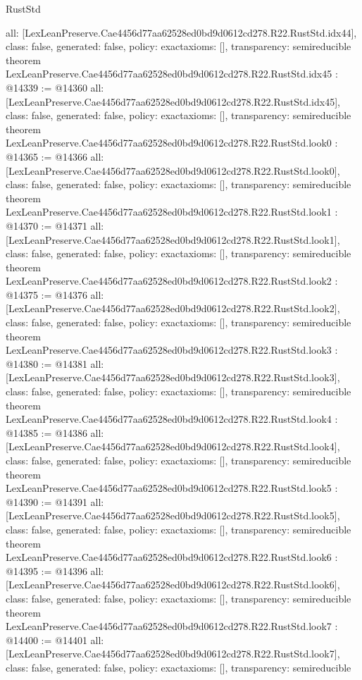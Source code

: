 \begin{lexlean}{RustStd}
\begin{coremodule}
{  all: [LexLeanPreserve.Cae4456d77aa62528ed0bd9d0612cd278.R22.RustStd.idx44],
  class: false,
  generated: false,
  policy: exact{axioms: []},
  transparency: semireducible
}
theorem LexLeanPreserve.Cae4456d77aa62528ed0bd9d0612cd278.R22.RustStd.idx45 : @14339 := @14360 {
  all: [LexLeanPreserve.Cae4456d77aa62528ed0bd9d0612cd278.R22.RustStd.idx45],
  class: false,
  generated: false,
  policy: exact{axioms: []},
  transparency: semireducible
}
theorem LexLeanPreserve.Cae4456d77aa62528ed0bd9d0612cd278.R22.RustStd.look0 : @14365 := @14366 {
  all: [LexLeanPreserve.Cae4456d77aa62528ed0bd9d0612cd278.R22.RustStd.look0],
  class: false,
  generated: false,
  policy: exact{axioms: []},
  transparency: semireducible
}
theorem LexLeanPreserve.Cae4456d77aa62528ed0bd9d0612cd278.R22.RustStd.look1 : @14370 := @14371 {
  all: [LexLeanPreserve.Cae4456d77aa62528ed0bd9d0612cd278.R22.RustStd.look1],
  class: false,
  generated: false,
  policy: exact{axioms: []},
  transparency: semireducible
}
theorem LexLeanPreserve.Cae4456d77aa62528ed0bd9d0612cd278.R22.RustStd.look2 : @14375 := @14376 {
  all: [LexLeanPreserve.Cae4456d77aa62528ed0bd9d0612cd278.R22.RustStd.look2],
  class: false,
  generated: false,
  policy: exact{axioms: []},
  transparency: semireducible
}
theorem LexLeanPreserve.Cae4456d77aa62528ed0bd9d0612cd278.R22.RustStd.look3 : @14380 := @14381 {
  all: [LexLeanPreserve.Cae4456d77aa62528ed0bd9d0612cd278.R22.RustStd.look3],
  class: false,
  generated: false,
  policy: exact{axioms: []},
  transparency: semireducible
}
theorem LexLeanPreserve.Cae4456d77aa62528ed0bd9d0612cd278.R22.RustStd.look4 : @14385 := @14386 {
  all: [LexLeanPreserve.Cae4456d77aa62528ed0bd9d0612cd278.R22.RustStd.look4],
  class: false,
  generated: false,
  policy: exact{axioms: []},
  transparency: semireducible
}
theorem LexLeanPreserve.Cae4456d77aa62528ed0bd9d0612cd278.R22.RustStd.look5 : @14390 := @14391 {
  all: [LexLeanPreserve.Cae4456d77aa62528ed0bd9d0612cd278.R22.RustStd.look5],
  class: false,
  generated: false,
  policy: exact{axioms: []},
  transparency: semireducible
}
theorem LexLeanPreserve.Cae4456d77aa62528ed0bd9d0612cd278.R22.RustStd.look6 : @14395 := @14396 {
  all: [LexLeanPreserve.Cae4456d77aa62528ed0bd9d0612cd278.R22.RustStd.look6],
  class: false,
  generated: false,
  policy: exact{axioms: []},
  transparency: semireducible
}
theorem LexLeanPreserve.Cae4456d77aa62528ed0bd9d0612cd278.R22.RustStd.look7 : @14400 := @14401 {
  all: [LexLeanPreserve.Cae4456d77aa62528ed0bd9d0612cd278.R22.RustStd.look7],
  class: false,
  generated: false,
  policy: exact{axioms: []},
  transparency: semireducible
}
\end{coremodule}
\end{lexlean}
